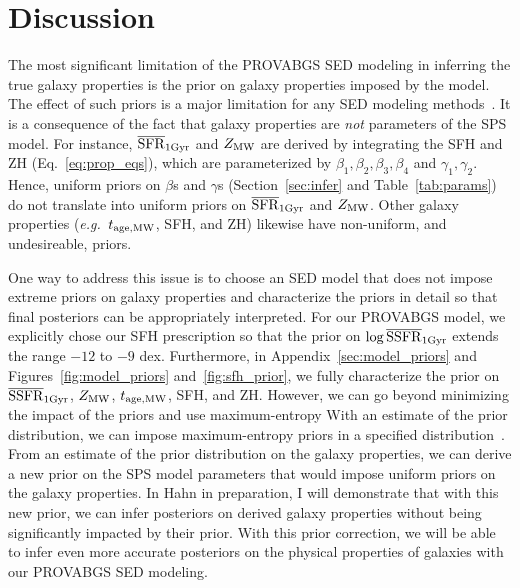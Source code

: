 \section{Discussion} \label{sec:discuss}
The most significant limitation of the {\sc PROVABGS} SED modeling in
inferring the true galaxy properties is the prior on galaxy properties imposed
by the model. 
The effect of such priors is  a major limitation for any SED modeling
methods~\citep{carnall2017, leja2019}. 
It is a consequence of the fact that galaxy properties are \emph{not}
parameters of the SPS model.
For instance, $\overline{\rm SFR}_{\rm 1Gyr}$ and $Z_{\rm MW}$ are derived by integrating the SFH and ZH
(Eq.~\ref{eq:prop_eqs}), which are parameterized by $\beta_1, \beta_2, \beta_3,
\beta_4$ and $\gamma_1, \gamma_2$. 
Hence, uniform priors on $\beta$s and $\gamma$s (Section~\ref{sec:infer} and
Table~\ref{tab:params}) do not translate into uniform priors on $\overline{\rm SFR}_{\rm 1Gyr}$ and
$Z_{\rm MW}$.
Other galaxy properties (\emph{e.g.}~$t_{\rm age, MW}$, SFH, and ZH) likewise have
non-uniform, and undesireable, priors. 

One way to address this issue  is to choose an SED model that does not impose
extreme priors on galaxy properties and characterize the priors in detail so
that final posteriors can be appropriately  interpreted. 
For our {\sc PROVABGS} model, we explicitly chose our SFH prescription so that
the prior on $\log\overline{\rm SSFR}_{\rm 1Gyr}$ extends the range $-12$ to $-9$ dex.
Furthermore, in Appendix~\ref{sec:model_priors} and
Figures~\ref{fig:model_priors} and~\ref{fig:sfh_prior}, we fully characterize
the prior on $\overline{\rm SSFR}_{\rm 1Gyr}$, $Z_{\rm MW}$, $t_{\rm age, MW}$, SFH, and ZH.
However, we can go beyond minimizing the impact of the priors and use
maximum-entropy 
With an estimate of the prior distribution, we can impose maximum-entropy
priors in a specified distribution~\citep{handley2019}. 
From an estimate of the prior distribution on the galaxy properties, we can
derive a new prior on the SPS model parameters that would impose uniform priors
on the galaxy properties. 
In Hahn in preparation, I will demonstrate that with this new prior, we can
infer posteriors on derived galaxy properties without being significantly
impacted by their prior. 
With this prior correction, we will be able to infer even more accurate
posteriors on the physical properties of galaxies with our {\sc PROVABGS} SED
modeling.

